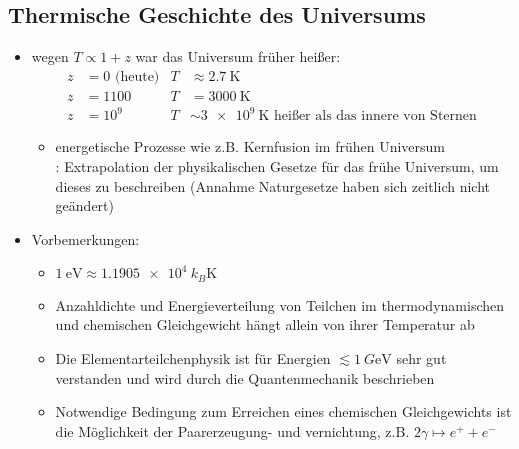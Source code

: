 \subsection{Thermische Geschichte des Universums}
\begin{itemize}
	\item wegen $T\propto 1+z$ war das Universum früher heißer:
		\begin{align*}
			z&=\num{0} \text{ (heute)} & T&\approx\SI{2.7}{\K}\\
			z&=\num{1100} & T&=\SI{3000}{\K}\\
			z&=10^9 & T&\sim\SI{3e9}{\K} \text{ heißer als das innere von Sternen}
		\end{align*}
		\begin{itemize}
			\item energetische Prozesse wie z.B. Kernfusion im frühen Universum\vspace{1mm}\\
				\textbf{\underline{}}: Extrapolation der physikalischen Gesetze für das frühe Universum, um dieses zu beschreiben (Annahme Naturgesetze haben sich zeitlich nicht geändert)
		\end{itemize}
	\item Vorbemerkungen:
		\begin{itemize}[label={\textbullet}]
			\item $\SI{1}{\eV}\approx\SI{1.1905e4}{k_B\K}$
			\item Anzahldichte und Energieverteilung von Teilchen im thermodynamischen und chemischen Gleichgewicht hängt allein von ihrer Temperatur ab
			\item Die Elementarteilchenphysik ist für Energien $\lesssim\SI{1}{G\eV}$ sehr gut verstanden und wird durch die Quantenmechanik beschrieben
			\item Notwendige Bedingung zum Erreichen eines chemischen Gleichgewichts ist die Möglichkeit der Paarerzeugung- und vernichtung, z.B. $2\gamma\mapsto e^++e^-$
		\end{itemize}
\end{itemize}
